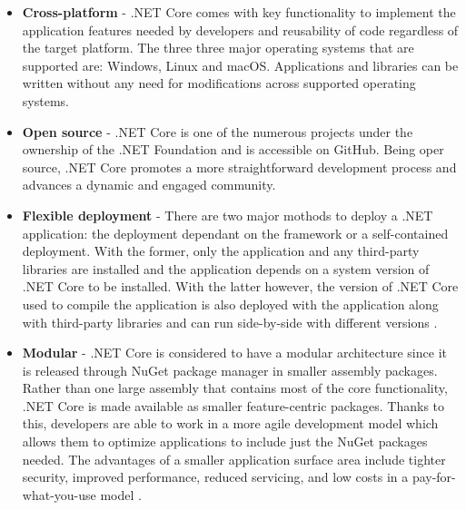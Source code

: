 \documentclass[../thesis.tex]{subfiles}
\begin{document}
\begin{itemize}
  \item \textbf{Cross-platform} - .NET Core comes with key functionality to implement the application features needed by developers and reusability of code regardless of the target platform. The three three major operating systems that are supported are: Windows, Linux and macOS. Applications and libraries can be written without any need for modifications across supported operating systems.
  \newline
    
  \item \textbf{Open source} - .NET Core is one of the numerous projects under the ownership of the .NET Foundation and is accessible on GitHub. Being oper source, .NET Core promotes a more straightforward development process and advances a dynamic and engaged community.
  \newline
    
  \item \textbf{Flexible deployment} - There are two major mothods to deploy a .NET application: the deployment dependant on the framework or a self-contained deployment. With the former, only the application and any third-party libraries are installed and the application depends on a system version of .NET Core to be installed. With the latter however, the version of .NET Core used to compile the application is also deployed with the application along with third-party libraries and can run side-by-side with different versions \cite{dotnet}.
  \newline
    
  \item \textbf{Modular} - .NET Core is considered to have a modular architecture since it is released through NuGet package manager in smaller assembly packages. Rather than one large assembly that contains most of the core functionality, .NET Core is made available as smaller feature-centric packages. Thanks to this, developers are able to work in a more agile development model which allows them to optimize applications to include just the NuGet packages needed. The advantages of a smaller application surface area include tighter security, improved performance, reduced servicing, and low costs in a pay-for-what-you-use model \cite{dotnet}.
\end{itemize}
    
\end{document}
